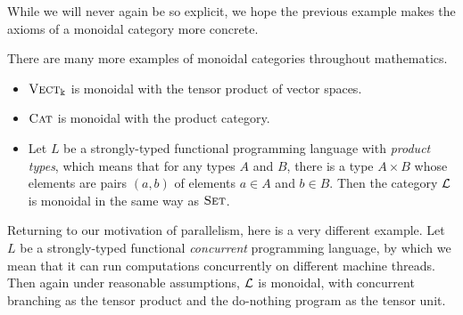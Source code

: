 While we will never again be so explicit, we hope the previous example makes the
axioms of a monoidal category more concrete.

\begin{ex}
  There are many more examples of monoidal categories throughout mathematics.
  \begin{itemize}
    \item ${\textsc{\text{Vect}}}_\Bbbk$ is monoidal with the tensor product of vector spaces.
    \item ${\textsc{\text{Cat}}}$ is monoidal with the product category.
    \item Let $L$ be a strongly-typed functional programming language with
      \emph{product types}, which means that for any types $A$ and $B$, there is
      a type $A\times B$ whose elements are pairs $(a, b)$ of elements $a\in A$
      and $b\in B$. Then the category $\mathcal{L}$ is monoidal in the same way as
      ${\textsc{\text{Set}}}$.
  \end{itemize}
\end{ex}

\begin{ex}
  Returning to our motivation of parallelism, here is a very different example.
  Let $L$ be a strongly-typed functional \emph{concurrent} programming language,
  by which we mean that it can run computations concurrently on different
  machine threads. Then again under reasonable assumptions, $\mathcal{L}$ is monoidal,
  with concurrent branching as the tensor product and the do-nothing program as
  the tensor unit.
\end{ex}



